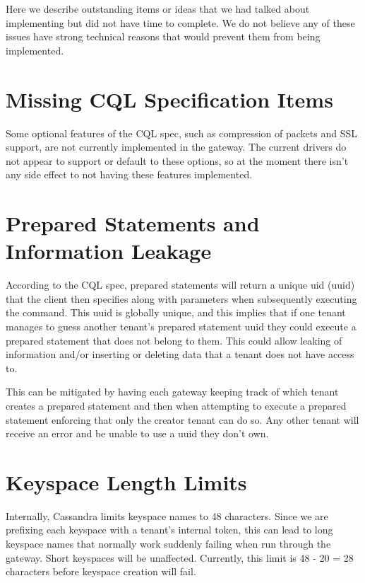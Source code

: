 \documentclass[11pt,notitlepage]{report}
\begin{document}
Here we describe outstanding items or ideas that we had talked about implementing but did not have time to complete. We do not believe any of these issues have strong technical reasons that would prevent them from being implemented.

\section*{Missing CQL Specification Items}

Some optional features of the CQL spec, such as compression of packets and SSL support, are not currently implemented in the gateway. The current drivers do not appear to support or default to these options, so at the moment there isn’t any side effect to not having these features implemented.


\section*{Prepared Statements and Information Leakage}

According to the CQL spec, prepared statements will return a unique uid (uuid) that the client then specifies along with parameters when subsequently executing the command. This uuid is globally unique, and this implies that if one tenant manages to guess another tenant’s prepared statement uuid they could execute a prepared statement that does not belong to them. This could allow leaking of information and/or inserting or deleting data that a tenant does not have access to.

This can be mitigated by having each gateway keeping track of which tenant creates a prepared statement and then when attempting to execute a prepared statement enforcing that only the creator tenant can do so. Any other tenant will receive an error and be unable to use a uuid they don’t own.


\section*{Keyspace Length Limits}

Internally, Cassandra limits keyspace names to 48 characters. Since we are prefixing each keyspace with a tenant’s internal token, this can lead to long keyspace names that normally work suddenly failing when run through the gateway. Short keyspaces will be unaffected. Currently, this limit is 48 - 20 = 28 characters before keyspace creation will fail.
\end{document}
